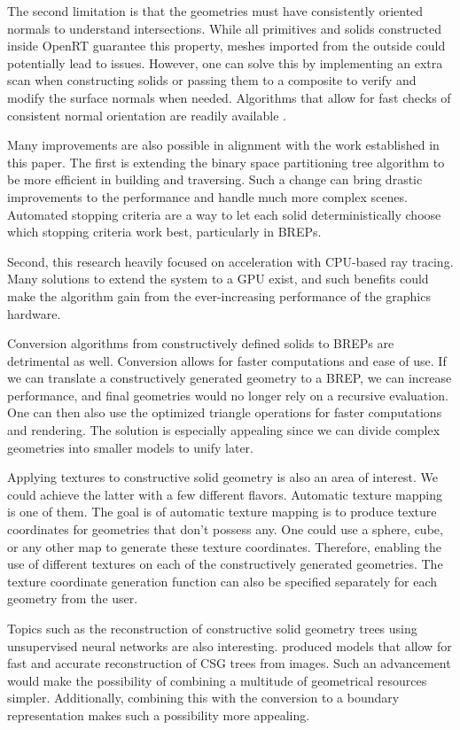 \documentclass[a4paper,11pt,oneside]{article}
\begin{document}
The second limitation is that the geometries must have consistently oriented normals to understand intersections. While all primitives and solids constructed inside OpenRT guarantee this property, meshes imported from the outside could potentially lead to issues. However, one can solve this by implementing an extra scan when constructing solids or passing them to a composite to verify and modify the surface normals when needed. Algorithms that allow for fast checks of consistent normal orientation are readily available \cite{normal_orientation}.

Many improvements are also possible in alignment with the work established in this paper. The first is extending the binary space partitioning tree algorithm to be more efficient in building and traversing. Such a change can bring drastic improvements to the performance and handle much more complex scenes. Automated stopping criteria are a way to let each solid deterministically choose which stopping criteria work best, particularly in BREPs.

Second, this research heavily focused on acceleration with CPU-based ray tracing. Many solutions to extend the system to a GPU exist, and such benefits could make the algorithm gain from the ever-increasing performance of the graphics hardware.

Conversion algorithms from constructively defined solids to BREPs are detrimental as well. Conversion allows for faster computations and ease of use. If we can translate a constructively generated geometry to a BREP,  we can increase performance, and final geometries would no longer rely on a recursive evaluation. One can then also use the optimized triangle operations for faster computations and rendering. The solution is especially appealing since we can divide complex geometries into smaller models to unify later.

Applying textures to constructive solid geometry is also an area of interest. We could achieve the latter with a few different flavors. Automatic texture mapping is one of them. The goal is of automatic texture mapping is to produce texture coordinates for geometries that don't possess any. One could use a sphere, cube, or any other map to generate these texture coordinates. Therefore, enabling the use of different textures on each of the constructively generated geometries.	 The texture coordinate generation function can also be specified separately for each geometry from the user.

Topics such as the reconstruction of constructive solid geometry trees using unsupervised neural networks are also interesting. \cite{ucsgnet_ml} produced models that allow for fast and accurate reconstruction of CSG trees from images. Such an advancement would make the possibility of combining a multitude of geometrical resources simpler. Additionally, combining this with the conversion to a boundary representation makes such a possibility more appealing.
  

\newpage
%
%
\printbibliography
\end{document}
